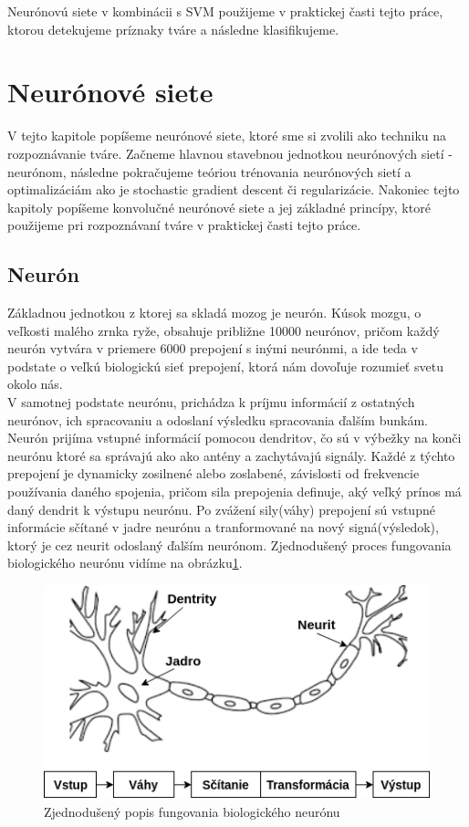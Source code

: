 \indent Neurónovú siete v kombinácii s SVM použijeme v praktickej časti tejto práce, ktorou detekujeme príznaky tváre a následne klasifikujeme.


\section{Neurónové siete}
V tejto kapitole popíšeme neurónové siete, ktoré sme si zvolili ako techniku na rozpoznávanie tváre.
Začneme hlavnou stavebnou jednotkou neurónových sietí - neurónom, následne pokračujeme teóriou trénovania neurónových sietí a optimalizáciám
ako je stochastic gradient descent či regularizácie.
Nakoniec tejto kapitoly popíšeme konvolučné neurónové siete a jej základné princípy, ktoré použijeme pri rozpoznávaní tváre v praktickej časti tejto práce.

\subsection{Neurón}
Základnou jednotkou z ktorej sa skladá mozog je neurón.
Kúsok mozgu, o veľkosti malého zrnka ryže, obsahuje približne 10000 neurónov, pričom každý neurón
vytvára v priemere 6000 prepojení s inými neurónmi, a ide teda v podstate o
veľkú biologickú sieť prepojení, ktorá nám dovoľuje rozumieť svetu okolo nás\cite{buduma2017fundamentals}. \\
\indent V samotnej podstate neurónu, prichádza k príjmu informácií z ostatných neurónov, 
ich spracovaniu a odoslaní výsledku spracovania ďalším bunkám.
Neurón prijíma vstupné informácií pomocou dendritov, čo sú v výbežky na konči neurónu ktoré sa správajú ako 
ako antény a zachytávajú signály.
Každé z týchto prepojení je dynamicky zosilnené alebo zoslabené, závislosti od frekvencie používania daného spojenia, pričom sila prepojenia definuje, aký veľký prínos má daný dendrit k výstupu neurónu\cite{buduma2017fundamentals}.
Po zvážení sily(váhy) prepojení sú vstupné informácie sčítané v jadre neurónu a tranformované na 
nový signá(výsledok), ktorý je cez neurit odoslaný ďalším neurónom.
Zjednodušený proces fungovania biologického neurónu vidíme na obrázku\ref{fig:bioneuron}.

\begin{figure}[H]
	\centering
	\includegraphics[width=0.5\linewidth]{img/bioneuron}
	\caption{Zjednodušený popis fungovania biologického neurónu}
	\label{fig:bioneuron}
\end{figure}

